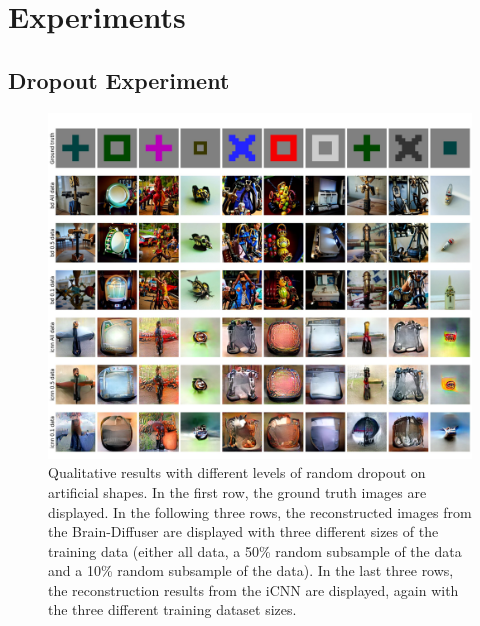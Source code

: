 \chapter{Experiments}
\section{Dropout Experiment}

\begin{figure}[ht]
   \centering
   \includegraphics[width=1\textwidth]{plots/dropout_qual_random_art.JPEG}
   \caption[Qualitative results random dropout on artificial shapes]{Qualitative results with different levels of random dropout on artificial shapes. In the first row, the ground truth images are displayed. In the following three rows, the reconstructed images from the Brain-Diffuser are displayed with three different sizes of the training data (either all data, a 50\% random subsample of the data and a 10\% random subsample of the data). In the last three rows, the reconstruction results from the iCNN are displayed, again with the three different training dataset sizes.}\label{fig:dropout_qual_random_art}
 \end{figure}


